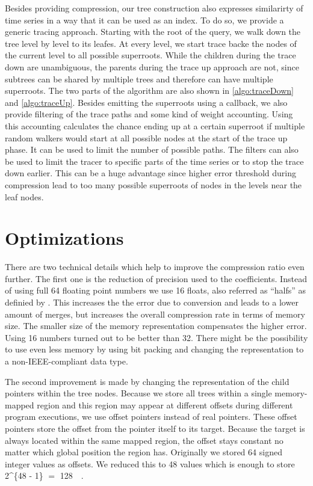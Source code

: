 Besides providing compression, our tree construction also expresses similarirty of time series in a way that it can be used as an index. To do so, we provide a generic tracing approach. Starting with the root of the query, we walk down the tree level by level to its leafes. At every level, we start trace backe the nodes of the current level to all possible superroots. While the children during the trace down are unambiguous, the parents during the trace up approach are not, since subtrees can be shared by multiple trees and therefore can have multiple superroots. The two parts of the algorithm are also shown in \autoref{algo:traceDown} and \autoref{algo:traceUp}. Besides emitting the superroots using a callback, we also provide filtering of the trace paths and some kind of weight accounting. Using this accounting calculates the chance ending up at a certain superroot if multiple random walkers would start at all possible nodes at the start of the trace up phase. It can be used to limit the number of possible paths. The filters can also be used to limit the tracer to specific parts of the time series or to stop the trace down earlier. This can be a huge advantage since higher error threshold during compression lead to too many possible superroots of nodes in the levels near the leaf nodes.



\section{Optimizations}
\label{sec:algorithm:opt}

There are two technical details which help to improve the compression ratio even further. The first one is the reduction of precision used to the coefficients. Instead of using full \SI{64}{\bit} floating point numbers we use \SI{16}{\bit} floats, also referred as \enquote{halfs} as definied by \cite{ieee_float}. This increases the the error due to conversion and leads to a lower amount of merges, but increases the overall compression rate in terms of memory size. The smaller size of the memory representation compensates the higher error. Using \SI{16}{\bit} numbers turned out to be better than \SI{32}{\bit}. There might be the possibility to use even less memory by using bit packing and changing the representation to a non-IEEE-compliant data type.

The second improvement is made by changing the representation of the child pointers within the tree nodes. Because we store all trees within a single memory-mapped region and this region may appear at different offsets during different program executions, we use offset pointers instead of real pointers. These offset pointers store the offset from the pointer itself to its target. Because the target is always located within the same mapped region, the offset stays constant no matter which global position the region has. Originally we stored \SI{64}{\bit} signed integer values as offsets. We reduced this to \SI{48}{\bit} values which is enough to store \SI[parse-numbers = false]{2^{48 - 1}}{\byte} $=$ \SI{128}{\tera\byte}.

